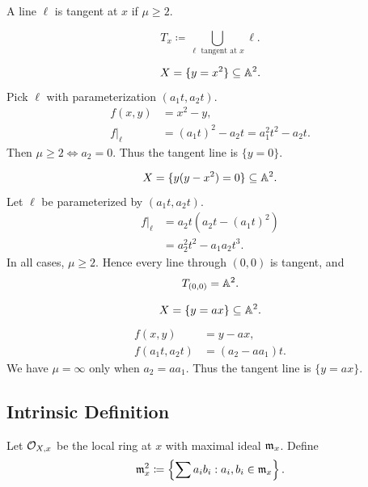 \begin{definition}
    A line $\ell$ is tangent at $x$ if $\mu \ge 2$.
\end{definition}

\begin{definition}
    \[
        T_x \coloneqq \bigcup_{\ell \text{ tangent at } x} \ell.
    \]
\end{definition}

\begin{example}
    \[
        X = \{y = x^2\} \subseteq \aa^2.
    \]
    Pick $\ell$ with parameterization $(a_1 t, a_2 t)$.
    \begin{align*}
        f(x,y) &= x^2 - y, \\
        f|_\ell &= (a_1 t)^2 - a_2 t = a_1^2 t^2 - a_2 t.
    \end{align*}
    Then $\mu \ge 2 \iff a_2 = 0$.
    Thus the tangent line is $\{y = 0\}$.
\end{example}

\begin{example}
    \[
        X = \{y(y - x^2) = 0\} \subseteq \aa^2.
    \]
    Let $\ell$ be parameterized by $(a_1 t, a_2 t)$.
    \begin{align*}
        f|_\ell &= a_2 t (a_2 t - (a_1 t)^2) \\
        &= a_2^2 t^2 - a_1 a_2 t^3.
    \end{align*}
    In all cases, $\mu \ge 2$.
    Hence every line through $(0,0)$ is tangent, and
    \[
        T_{(0,0)} = \aa^2.
    \]
\end{example}

\begin{example}
    \[
        X = \{y = a x\} \subseteq \aa^2.
    \]
    \begin{align*}
        f(x,y) &= y - ax, \\
        f(a_1 t, a_2 t) &= (a_2 - a a_1)t.
    \end{align*}
    We have $\mu = \infty$ only when $a_2 = a a_1$.
    Thus the tangent line is $\{y = ax\}$.
\end{example}

\subsection{Intrinsic Definition}

Let $\o_{X,x}$ be the local ring at $x$ with maximal ideal $\m_x$.
Define
\[
    \m_x^2 \coloneqq \left\{ \sum a_i b_i : a_i, b_i \in \m_x \right\}.
\]

